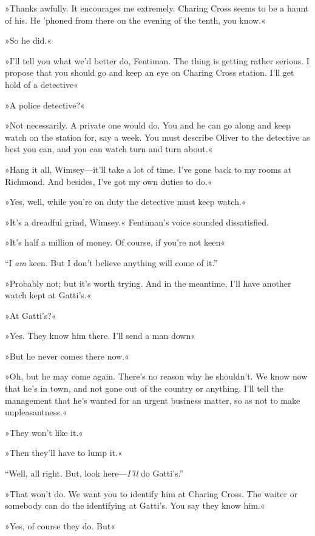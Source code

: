 »Thanks awfully. It encourages me extremely. Charing Cross seems to be a haunt of his. He 'phoned from there on the evening of the tenth, you know.«

»So he did.«

»I'll tell you what we'd better do, Fentiman. The thing is getting rather serious. I propose that you should go and keep an eye on Charing Cross station. I'll get hold of a detective\longdash«

»A police detective?«

»Not necessarily. A private one would do. You and he can go along and keep watch on the station for, say a week. You must describe Oliver to the detective as best you can, and you can watch turn and turn about.«

»Hang it all, Wimsey\allowbreak---\allowbreak it'll take a lot of time. I've gone back to my rooms at Richmond. And besides, I've got my own duties to do.«

»Yes, well, while you're on duty the detective must keep watch.«

»It's a dreadful grind, Wimsey.« Fentiman's voice sounded dissatisfied.

»It's half a million of money. Of course, if you're not keen\longdash«

\enquote{I \textit{am} keen. But I don't believe anything will come of it.}

»Probably not; but it's worth trying. And in the meantime, I'll have another watch kept at Gatti's.«

»At Gatti's?«

»Yes. They know him there. I'll send a man down\longdash«

»But he never comes there now.«

»Oh, but he may come again. There's no reason why he shouldn't. We know now that he's in town, and not gone out of the country or anything. I'll tell the management that he's wanted for an urgent business matter, so as not to make unpleasantness.«

»They won't like it.«

»Then they'll have to lump it.«

\enquote{Well, all right. But, look here---\textit{I'll} do Gatti's.}

»That won't do. We want you to identify him at Charing Cross. The waiter or somebody can do the identifying at Gatti's. You say they know him.«

»Yes, of course they do. But\longdash«


